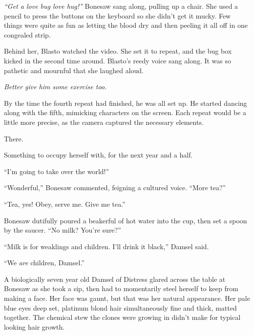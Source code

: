 \emph{``Get a love bug love hug!'' }Bonesaw sang along, pulling up a chair.  She used a pencil to press the buttons on the keyboard so she didn't get it mucky.  Few things were quite as fun as letting the blood dry and then peeling it all off in one congealed strip.



Behind her, Blasto watched the video.  She set it to repeat, and the bug box kicked in the second time around.  Blasto's reedy voice sang along.  It was so pathetic and mournful that she laughed aloud.



\emph{Better give him some exercise too}.



By the time the fourth repeat had finished, he was all set up.  He started dancing along with the fifth, mimicking characters on the screen.  Each repeat would be a little more precise, as the camera captured the necessary elements.



There.



Something to occupy herself with, for the next year and a half.



\sectionbreak






``I'm going to take over the world!''



``Wonderful,'' Bonesaw commented, feigning a cultured voice.  ``More tea?''



``Tea, yes!  Obey, serve me.  Give me tea.''



Bonesaw dutifully poured a beakerful of hot water into the cup, then set a spoon by the saucer.  ``No milk?  You're sure?''



``Milk is for weaklings and children.  I'll drink it black,'' Damsel said.



``We \emph{are} children, Damsel.''



A biologically seven year old Damsel of Distress glared across the table at Bonesaw as she took a sip, then had to momentarily steel herself to keep from making a face.  Her face was gaunt, but that was her natural appearance.  Her pale blue eyes deep set, platinum blond hair simultaneously fine and thick, matted together.  The chemical stew the clones were growing in didn't make for typical looking hair growth.



